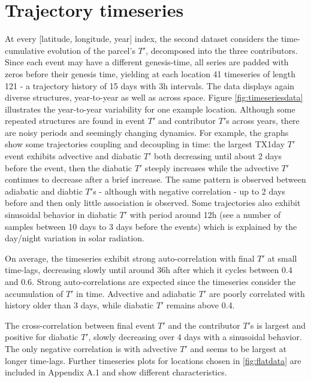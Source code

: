 \documentclass[11pt,a4paper,twoside,openright]{report}
\theoremstyle{definition}
\begin{document}
\section{Trajectory timeseries}\label{trajectory-timeseries}

At every {[}latitude, longitude, year{]} index, the second dataset considers the time-cumulative evolution of the parcel's \(T'\), decomposed into the three contributors. Since each event may have a different genesis-time, all series are padded with zeros before their genesis time, yielding at each location 41 timeseries of length 121 - a trajectory history of 15 days with 3h intervals. The data displays again diverse structures, year-to-year as well as across space. Figure \ref{fig:timeseriesdata} illustrates the year-to-year variability for one example location. Although some repeated structures are found in event \(T'\) and contributor \(T'\)s across years, there are noisy periods and seemingly changing dynamics. For example, the graphs show some trajectories coupling and decoupling in time: the largest TX1day \(T'\) event exhibits advective and diabatic \(T'\) both decreasing until about 2 days before the event, then the diabatic \(T'\) steeply increases while the advective \(T'\) continues to decrease after a brief increase. The same pattern is observed between adiabatic and diabtic \(T'\)s - although with negative correlation - up to 2 days before and then only little association is observed. Some trajectories also exhibit sinusoidal behavior in diabatic \(T'\) with period around 12h (see a number of samples between 10 days to 3 days before the events) which is explained by the day/night variation in solar radiation.

On average, the timeseries exhibit strong auto-correlation with final \(T'\) at small time-lags, decreasing slowly until around 36h after which it cycles between 0.4 and 0.6. Strong auto-correlations are expected since the timeseries consider the accumulation of \(T'\) in time. Advective and adiabatic \(T'\) are poorly correlated with history older than 3 days, while diabatic \(T'\) remains above 0.4.

The cross-correlation between final event \(T'\) and the contributor \(T'\)s is largest and positive for diabatic \(T'\), slowly decreasing over 4 days with a sinusoidal behavior. The only negative correlation is with advective \(T'\) and seems to be largest at longer time-lags. Further timeseries plots for locations chosen in \ref{fig:flatdata} are included in Appendix A.1 and show different characteristics.
\end{document}
